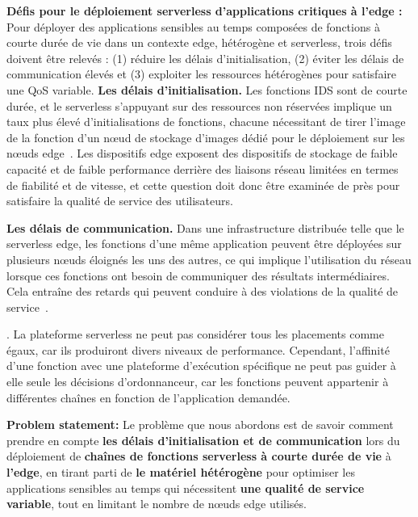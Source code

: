 \textbf{Défis pour le déploiement serverless d'applications critiques à l'edge :} Pour déployer des applications sensibles au temps composées de fonctions à courte durée de vie dans un contexte edge, hétérogène et serverless, trois défis doivent être relevés : (1) réduire les délais d'initialisation, (2) éviter les délais de communication élevés et (3) exploiter les ressources hétérogènes pour satisfaire une QoS variable.
\textbf{Les délais d'initialisation.} Les fonctions IDS sont de courte durée, et le serverless s'appuyant sur des ressources non réservées implique un taux plus élevé d'initialisations de fonctions, chacune nécessitant de tirer l'image de la fonction d'un nœud de stockage d'images dédié pour le déploiement sur les nœuds edge~\cite{yanHermesEfficientCache2020}. Les dispositifs edge exposent des dispositifs de stockage de faible capacité et de faible performance derrière des liaisons réseau limitées en termes de fiabilité et de vitesse, et cette question doit donc être examinée de près pour satisfaire la qualité de service des utilisateurs.

\textbf{Les délais de communication.} Dans une infrastructure distribuée telle que le serverless edge, les fonctions d'une même application peuvent être déployées sur plusieurs nœuds éloignés les uns des autres, ce qui implique l'utilisation du réseau lorsque ces fonctions ont besoin de communiquer des résultats intermédiaires. Cela entraîne des retards qui peuvent conduire à des violations de la qualité de service~\cite{wawrzoniakBoxerDataAnalytics2021a}.

\cite{wawrzoniakBoxerDataAnalytics2021a}. La plateforme serverless ne peut pas considérer tous les placements comme égaux, car ils produiront divers niveaux de performance. Cependant, l'affinité d'une fonction avec une plateforme d'exécution spécifique ne peut pas guider à elle seule les décisions d'ordonnanceur, car les fonctions peuvent appartenir à différentes chaînes en fonction de l'application demandée.

\textbf{Problem statement:} Le problème que nous abordons est de savoir comment prendre en compte \textbf{les délais d'initialisation et de communication} lors du déploiement de \textbf{chaînes de fonctions serverless à courte durée de vie} à \textbf{l'edge}, en tirant parti de \textbf{le matériel hétérogène} pour optimiser les applications sensibles au temps qui nécessitent \textbf{une qualité de service variable}, tout en limitant le nombre de nœuds edge utilisés.

